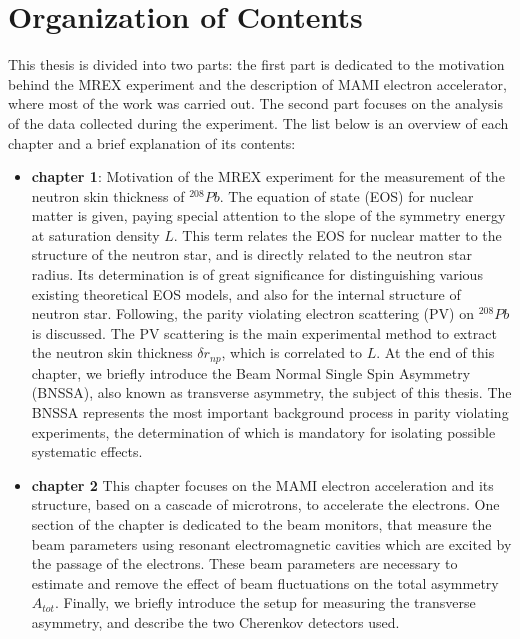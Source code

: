 \chapter*{Organization of Contents}

This thesis is divided into two parts: the first part is dedicated to the motivation behind the MREX experiment and the description of MAMI electron accelerator, where most of the work was carried out. The second part focuses on the analysis of the data collected during the experiment. The list below is an overview of each chapter and a brief explanation of its contents:

\begin{itemize}
\item \textbf{chapter 1}: Motivation of the MREX experiment for the measurement of the neutron skin thickness of $^{208}Pb$. The equation of state (EOS) for nuclear matter is given, paying special attention to the slope of the symmetry energy at saturation density $L$. This term relates the EOS for nuclear matter to the structure of the neutron star, and is directly related to the neutron star radius. Its determination is of great significance for distinguishing various existing theoretical EOS models, and also for the internal structure of neutron star. Following, the parity violating electron scattering (PV) on $^{208}Pb$ is discussed. The PV scattering is the main experimental method to extract the neutron skin thickness $\delta r_{np}$, which is correlated to $L$. At the end of this chapter, we briefly introduce the Beam Normal Single Spin Asymmetry (BNSSA), also known as transverse asymmetry, the subject of this thesis. The BNSSA represents the most important background process in parity violating experiments, the determination of which is mandatory for isolating possible systematic effects. 
\item \textbf{chapter 2} This chapter focuses on the MAMI electron acceleration and its structure, based on a cascade of microtrons, to accelerate the electrons. One section of the chapter is dedicated to the beam monitors, that measure the beam parameters using resonant electromagnetic cavities which are excited by the passage of the electrons. These beam parameters are necessary to estimate and remove the effect of beam fluctuations on the total asymmetry $A_{tot}$. Finally, we briefly introduce  the setup for measuring the transverse asymmetry, and describe the two Cherenkov detectors used.

\end{itemize}
